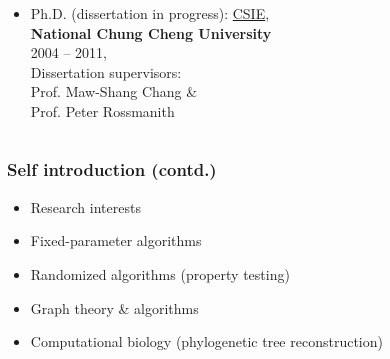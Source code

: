\documentclass[xcolor=dvipsnames,envcountsect,handout]{beamer}
\begin{document}
\begin{frame}
\begin{columns}
\begin{column}[t]{6cm}
\begin{footnotesize}
\begin{itemize}
{\bf National Chi Nan University}\\
2002 -- 2004,\\
Thesis supervisor: \\
Prof. Richard Chia-Tung Lee
\item Ph.D. (dissertation in progress): \underline{CSIE}, \\
{\bf National Chung Cheng University}\\
2004 -- 2011, \\
Dissertation supervisors: \\
Prof. Maw-Shang Chang \& \\
Prof. Peter Rossmanith
\end{itemize}
\end{footnotesize}
\end{column}
\end{columns}
\end{frame}


\begin{frame}
\frametitle{Self introduction (contd.)}
\begin{itemize}
\item [] Research interests
\end{itemize}
\begin{itemize}
\item Fixed-parameter algorithms
\vspace{4pt}
\item Randomized algorithms (property testing)
\vspace{4pt}
\item Graph theory \& algorithms
\vspace{4pt}
\item Computational biology (phylogenetic tree reconstruction)
\end{itemize}
\end{frame}
\end{document}
